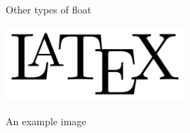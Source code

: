 \documentclass{article}
\begin{document}
Other types of float

\graphicspath{{./img/}}

\begin{customfloat}
    \centering
    \includegraphics[width=0.5\textwidth]{latex_logo.png}
    \caption{An example image}
\end{customfloat}
\end{document}
